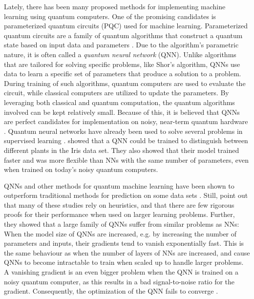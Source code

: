 Lately, there has been many proposed methods for implementing machine learning using quantum computers. One of the promising candidates is parameterized quantum circuits (PQC) used for machine learning. Parameterized quantum circuits are a family of quantum algorithms that construct a quantum state based on input data and parameters \cite{Benedetti_2019}. Due to the algorithm's parametric nature, it is often called a \emph{quantum neural network} (QNN). Unlike algorithms that are tailored for solving specific problems, like Shor's algorithm, QNNs use data to learn a specific set of parameters that produce a solution to a problem. During training of such algorithms, quantum computers are used to evaluate the circuit, while classical computers are utilized to update the parameters. By leveraging both classical and quantum computation, the quantum algorithms involved can be kept relatively small. Because of this, it is believed that QNNs are perfect candidates for implementation on noisy, near-term quantum hardware \cite{Cerezo_2021}. Quantum neural networks have already been used to solve several problems in supervised learning \cite{Benedetti_2019, abbas2020power, lloyd2018quantum}. \citet{abbas2020power} showed that a QNN could be trained to distinguish between different plants in the Iris data set. They also showed that their model trained faster and was more flexible than NNs with the same number of parameters, even when trained on today's noisy quantum computers.

QNNs and other methods for quantum machine learning have been shown to outperform traditional methods for prediction on some data sets \cite{abbas2020power, Circuit-centric}. Still, \citet{McClean_2018} point out that many of these studies rely on heuristics, and that there are few rigorous proofs for their performance when used on larger learning problems. Further, they showed that a large family of QNNs suffer from similar problems as NNs: When the model size of QNNs are increased, e.g. by increasing the number of parameters and inputs, their gradients tend to vanish exponentially fast. This is the same behaviour as when the number of layers of NNs are increased, and cause QNNs to become intractable to train when scaled up to handle larger problems. A vanishing gradient is an even bigger problem when the QNN is trained on a noisy quantum computer, as this results in a bad signal-to-noise ratio for the gradient. Consequently, the optimization of the QNN fails to converge \cite{skolik2020layerwise}.

